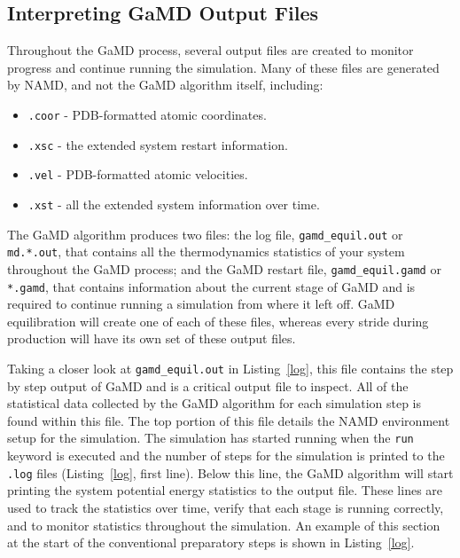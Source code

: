 \documentclass[9pt,tutorial]{livecoms}
\begin{document}
\subsection{Interpreting GaMD Output Files}
\label{ss:interpret_output}
Throughout the GaMD process, several output files are created to monitor progress and continue running the simulation. Many of these files are generated by NAMD, and not the GaMD algorithm itself, including:

\begin{itemize}
    \item \texttt{.coor} - PDB-formatted atomic coordinates.
    \item \texttt{.xsc} - the extended system restart information.
    \item \texttt{.vel} - PDB-formatted atomic velocities.
    \item \texttt{.xst} - all the extended system information over time. 
    
\end{itemize}

The GaMD algorithm produces two files: the log file, \texttt{gamd\_equil.out} or \texttt{md.*.out}, that contains all the thermodynamics statistics of your system throughout the GaMD process; and the GaMD restart file, \texttt{gamd\_equil.gamd} or \texttt{*.gamd}, that contains information about the current stage of GaMD and is required to continue running a simulation from where it left off. GaMD equilibration will create one of each of these files, whereas every stride during production will have its own set of these output files.

Taking a closer look at \texttt{gamd\_equil.out} in Listing~\ref{log}, this file contains the step by step output of GaMD and is a critical output file to inspect. All of the statistical data collected by the GaMD algorithm for each simulation step is found within this file. The top portion of this file details the NAMD environment setup for the simulation. The simulation has started running when the \texttt{run} keyword is executed and the number of steps for the simulation is printed to the \texttt{.log} files (Listing~\ref{log}, first line). Below this line, the GaMD algorithm will start printing the system potential energy statistics to the output file. These lines are used to track the statistics over time, verify that each stage is running correctly, and to monitor statistics throughout the simulation. An example of this section at the start of the conventional preparatory steps is shown in Listing~\ref{log}.
\end{document}
